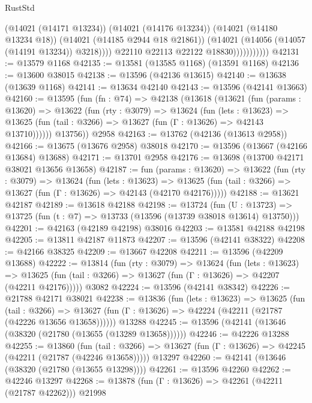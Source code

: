 \begin{lexlean}{RustStd}
\begin{coremodule}
                              (@14021 (@14171 @13234))
                              (@14021 (@14176 @13234))
                              (@14021 (@14180 @13234 @18))
                              (@14021 (@14185 @2944 @18 @21861))
                              (@14021 (@14056 (@14057 (@14191 @13234)) @3218))))
                          @22110
                          @22113
                          @22122
                          @18830)))))))))))
@42131 := @13579 @1168
@42135 := @13581 (@13585 @1168) (@13591 @1168)
@42136 := @13600 @38015
@42138 := @13596 (@42136 @13615)
@42140 := @13638 (@13639 @1168)
@42141 := @13634 @42140
@42143 := @13596 (@42141 @13663)
@42160 := @13595
    (fun (fn : @74) =>
    @42138
      (@13618
        (@13621
          (fun (params : @13620) =>
          @13622
            (fun (rty : @3079) =>
            @13624
              (fun (lets : @13623) =>
              @13625 (fun (tail : @3266) => @13627 (fun (Γ : @13626) => @42143 @13710))))))
        @13756))
    @2958
@42163 := @13762 (@42136 (@13613 @2958))
@42166 := @13675 (@13676 @2958) @38018
@42170 := @13596 (@13667 (@42166 @13684) @13688)
@42171 := @13701 @2958
@42176 := @13698 (@13700 @42171 @38021 @13656 @13658)
@42187 := fun (params : @13620) =>
  @13622
    (fun (rty : @3079) =>
    @13624
      (fun (lets : @13623) =>
      @13625 (fun (tail : @3266) => @13627 (fun (Γ : @13626) => @42143 (@42170 @42176)))))
@42188 := @13621 @42187
@42189 := @13618 @42188
@42198 := @13724
    (fun (U : @13723) => @13725 (fun (t : @7) => @13733 (@13596 (@13739 @38018 @13614) @13750)))
@42201 := @42163 (@42189 @42198) @38016
@42203 := @13581 @42188 @42198
@42205 := @13811 @42187 @11873
@42207 := @13596 (@42141 @38322)
@42208 := @42166 @38325
@42209 := @13667 @42208
@42211 := @13596 (@42209 @13688)
@42222 := @13814
    (fun (rty : @3079) =>
    @13624
      (fun (lets : @13623) =>
      @13625 (fun (tail : @3266) => @13627 (fun (Γ : @13626) => @42207 (@42211 @42176)))))
    @3082
@42224 := @13596 (@42141 @38342)
@42226 := @21788 @42171 @38021
@42238 := @13836
    (fun (lets : @13623) =>
    @13625
      (fun (tail : @3266) =>
      @13627 (fun (Γ : @13626) => @42224 (@42211 (@21787 (@42226 @13656 @13658))))))
    @13288
@42245 := @13596 (@42141 (@13646 (@38320 (@21780 (@13655 (@13289 @13658))))))
@42246 := @42226 @13288
@42255 := @13860
    (fun (tail : @3266) => @13627 (fun (Γ : @13626) => @42245 (@42211 (@21787 (@42246 @13658)))))
    @13297
@42260 := @42141 (@13646 (@38320 (@21780 (@13655 @13298))))
@42261 := @13596 @42260
@42262 := @42246 @13297
@42268 := @13878 (fun (Γ : @13626) => @42261 (@42211 (@21787 @42262))) @21998

\end{coremodule}
\end{lexlean}
